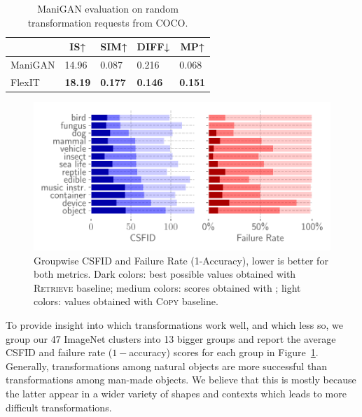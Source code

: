 \begin{table}[h!]
\centering
\begin{tabular}{l|l|l|l|l|}
\cline{2-5}
                              & \multicolumn{1}{c|}{IS↑} & \multicolumn{1}{c|}{SIM↑} & \multicolumn{1}{c|}{DIFF↓}             & \multicolumn{1}{c|}{MP↑} \\ \hline
\multicolumn{1}{|l|}{ManiGAN} & 14.96                   & 0.087                    & 0.216                                 & 0.068                   \\ \hline
\multicolumn{1}{|l|}{FlexIT}  & \textbf{18.19}          & \textbf{0.177}           & {\color[HTML]{000000} \textbf{0.146}} & \textbf{0.151}          \\ \hline
\end{tabular}
\caption{ManiGAN evaluation on random transformation requests from COCO.}
\label{results_manigan}
\end{table}



\begin{figure}[h!]
    \centering
    \vspace{-1em}
    \includegraphics[width=\linewidth]{images/flexit/assets/classwise.pdf}
    \caption{Groupwise CSFID  and Failure Rate (1-Accuracy),  lower is better for both metrics. 
    Dark colors: best possible values obtained with  \textsc{Retrieve} baseline; medium colors: scores obtained with \ours; light colors: values obtained with  \textsc{Copy} baseline. 
    }
\label{fig:classwise}
\end{figure}

To provide insight into which transformations work well, and which less so, we group 
our 47 ImageNet clusters into 13 bigger groups and report 
the average \ac{CSFID} and failure rate ($1 -$accuracy) scores for each group in Figure~\ref{fig:classwise}.
Generally, transformations among  natural objects are more successful than
 transformations among man-made objects. We believe that this is mostly because the 
 latter appear in a wider variety of shapes and contexts which leads to more difficult 
 transformations.




